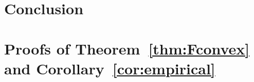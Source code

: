 \documentclass[nohyperref]{article}
\theoremstyle{plain}
\theoremstyle{definition}
\theoremstyle{remark}
\begin{document}
\section{Conclusion}






\newpage
\appendix
\onecolumn

\section{Proofs of Theorem~\ref{thm:Fconvex} and Corollary~\ref{cor:empirical}} \label{apdx:proofs}
\end{document}

